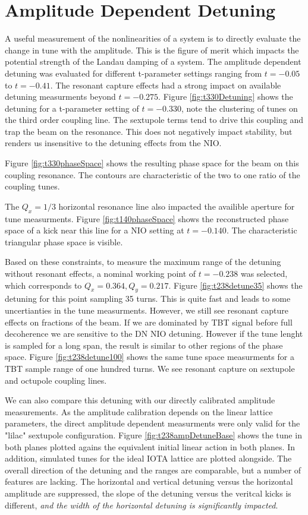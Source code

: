 \section{Amplitude Dependent Detuning} \label{sec:ampDetune}
A useful measurement of the nonlinearities of a system is to directly evaluate the change in tune with the amplitude. This is the figure of merit which impacts the potential strength of the Landau damping of a system. The amplitude dependent detuning was evaluated for different t-parameter settings ranging from $t=-0.05$ to $t=-0.41$. The resonant capture effects had a strong impact on available detuning measurments beyond $t=-0.275$. Figure \ref{fig:t330Detuning} shows the detuning for a t-parameter setting of $t=-0.330$, note the clustering of tunes on the third order coupling line. The sextupole terms tend to drive this coupling and trap the beam on the resonance. This does not negatively impact stability, but renders us insensitive to the detuning effects from the NIO.

Figure \ref{fig:t330phaseSpace} shows the resulting phase space for the beam on this coupling resonance. The contours are characteristic of the two to one ratio of the coupling tunes.

The $Q_x = 1/3$ horizontal resonance line also impacted the availible aperture for tune measurments. Figure \ref{fig:t140phaseSpace} shows the reconstructed phase space of a kick near this line for a NIO setting at $t=-0.140$. The characteristic triangular phase space is visible.

Based on these constraints, to measure the maximum range of the detuning without resonant effects, a nominal working point of $t=-0.238$ was selected, which corresponds to $Q_x = 0.364, Q_y = 0.217$. Figure \ref{fig:t238detune35} shows the detuning for this point sampling 35 turns. This is quite fast and leads to some uncertianties in the tune measurments. However, we still see resonant capture effects on fractions of the beam. If we are dominated by TBT signal before full decoherence we are sensitive to the DN NIO detuning. However if the tune lenght is sampled for a long span, the result is similar to other regions of the phase space. Figure \ref{fig:t238detune100} shows the same tune space measurments for a TBT sample range of one hundred turns. We see resonant capture on sextupole and octupole coupling lines.


We can also compare this detuning with our directly calibrated amplitude measurements. As the amplitude calibration depends on the linear lattice parameters, the direct amplitude dependent measurments were only valid for the "lilac" sextupole configuration. Figure \ref{fig:t238ampDetuneBase} shows the tune in both planes plotted agains the equivalent initial linear action in both planes. In addition, simulated tunes for the ideal IOTA lattice are plotted alongside. The overall direction of the detuning and the ranges are comparable, but a number of features are lacking. The horizontal and vertical detuning versus the horizontal amplitude are suppressed, the slope of the detuning versus the veritcal kicks is different, \textit{and the width of the horizontal detuning is significantly impacted}.

